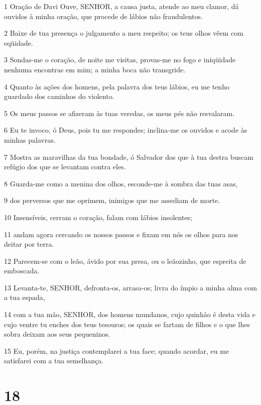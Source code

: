 \par 1 Oração de Davi Ouve, SENHOR, a causa justa, atende ao meu clamor, dá ouvidos à minha oração, que procede de lábios não fraudulentos.
\par 2 Baixe de tua presença o julgamento a meu respeito; os teus olhos vêem com eqüidade.
\par 3 Sondas-me o coração, de noite me visitas, provas-me no fogo e iniqüidade nenhuma encontras em mim; a minha boca não transgride.
\par 4 Quanto às ações dos homens, pela palavra dos teus lábios, eu me tenho guardado dos caminhos do violento.
\par 5 Os meus passos se afizeram às tuas veredas, os meus pés não resvalaram.
\par 6 Eu te invoco, ó Deus, pois tu me respondes; inclina-me os ouvidos e acode às minhas palavras.
\par 7 Mostra as maravilhas da tua bondade, ó Salvador dos que à tua destra buscam refúgio dos que se levantam contra eles.
\par 8 Guarda-me como a menina dos olhos, esconde-me à sombra das tuas asas,
\par 9 dos perversos que me oprimem, inimigos que me assediam de morte.
\par 10 Insensíveis, cerram o coração, falam com lábios insolentes;
\par 11 andam agora cercando os nossos passos e fixam em nós os olhos para nos deitar por terra.
\par 12 Parecem-se com o leão, ávido por sua presa, ou o leãozinho, que espreita de emboscada.
\par 13 Levanta-te, SENHOR, defronta-os, arrasa-os; livra do ímpio a minha alma com a tua espada,
\par 14 com a tua mão, SENHOR, dos homens mundanos, cujo quinhão é desta vida e cujo ventre tu enches dos teus tesouros; os quais se fartam de filhos e o que lhes sobra deixam aos seus pequeninos.
\par 15 Eu, porém, na justiça contemplarei a tua face; quando acordar, eu me satisfarei com a tua semelhança.

\chapter{18}

